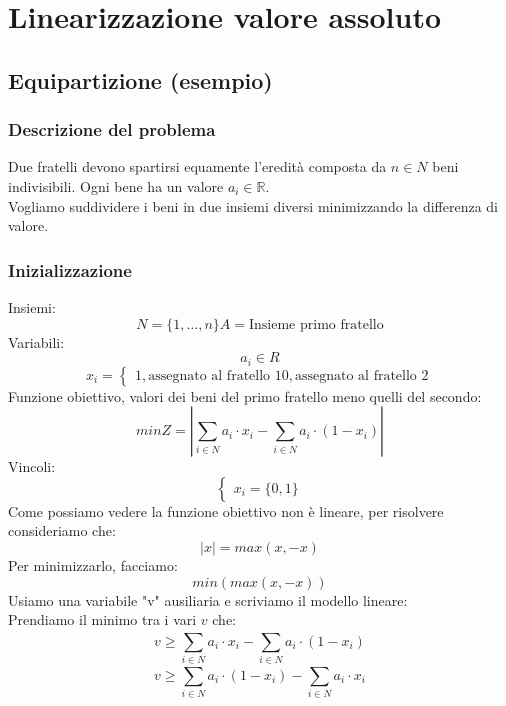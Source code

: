 \documentclass[12pt,a4paper]{article}
\let\oldsection\section
\renewcommand{\section}{\clearpage\oldsection}
\begin{document}
\section{Linearizzazione valore assoluto}
\subsection{Equipartizione (esempio)}
\subsubsection{Descrizione del problema}
Due fratelli devono spartirsi equamente l'eredità composta da $n \in N$ beni indivisibili. Ogni bene ha un valore $a_i \in \mathbb{R}$.\\
Vogliamo suddividere i beni in due insiemi diversi minimizzando la differenza di valore.
\subsubsection{Inizializzazione}
Insiemi:
\[
N = \{1,\ldots,n\}
A = \text{Insieme primo fratello}
\]
Variabili:
\[
a_i \in R
\]
\[
x_i = \begin{cases}
    1, \text{assegnato al fratello 1}
    0, \text{assegnato al fratello 2}
\end{cases}
\]
Funzione obiettivo, valori dei beni del primo fratello meno quelli del secondo:
\[
minZ = |\sum_{i \in N}^{} a_i \cdot x_i - \sum_{i \in N}^{} a_i \cdot (1-x_i)|
\]
Vincoli:
\[
\begin{cases}
    x_i = \{0,1\}
\end{cases}
\]
Come possiamo vedere la funzione obiettivo non è lineare, per risolvere consideriamo che:
\[
|x| = max(x,-x)
\]
Per minimizzarlo, facciamo:
\[
min(max(x,-x))
\]
Usiamo una variabile "v" ausiliaria e scriviamo il modello lineare:\\
Prendiamo il minimo tra i vari $v$ che:
\[
v \geq \sum_{i \in N}^{} a_i \cdot x_i - \sum_{i \in N}^{} a_i \cdot (1-x_i)
\]
\[
v \geq \sum_{i \in N}^{} a_i \cdot (1-x_i) - \sum_{i \in N}^{} a_i \cdot x_i 
\]
\end{document}
